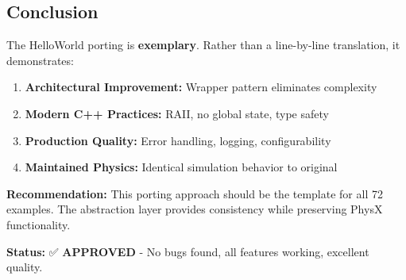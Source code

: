 \subsection{Conclusion}

The HelloWorld porting is \textbf{exemplary}. Rather than a line-by-line translation, it demonstrates:

\begin{enumerate}
    \item \textbf{Architectural Improvement:} Wrapper pattern eliminates complexity
    \item \textbf{Modern C++ Practices:} RAII, no global state, type safety
    \item \textbf{Production Quality:} Error handling, logging, configurability
    \item \textbf{Maintained Physics:} Identical simulation behavior to original
\end{enumerate}

\textbf{Recommendation:} This porting approach should be the template for all 72 examples. The abstraction layer provides consistency while preserving PhysX functionality.

\textbf{Status:} ✅ \textbf{APPROVED} - No bugs found, all features working, excellent quality.


